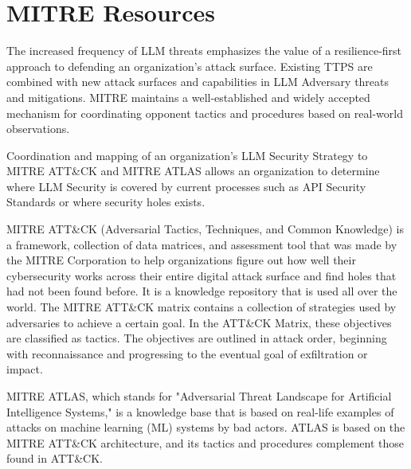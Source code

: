 
\clearpage
\section{MITRE Resources}

The increased frequency of LLM threats emphasizes the value of a
resilience-first approach to defending an organization's attack surface.
Existing TTPS are combined with new attack surfaces and capabilities in LLM
Adversary threats and mitigations. MITRE maintains a well-established and
widely accepted mechanism for coordinating opponent tactics and procedures
based on real-world observations.

Coordination and mapping of an organization's LLM Security Strategy to MITRE
ATT\&CK and MITRE ATLAS allows an organization to determine where LLM Security
is covered by current processes such as API Security Standards or where
security holes exists.

MITRE ATT\&CK (Adversarial Tactics, Techniques, and Common Knowledge) is a
framework, collection of data matrices, and assessment tool that was made by
the MITRE Corporation to help organizations figure out how well their
cybersecurity works across their entire digital attack surface and find holes
that had not been found before. It is a knowledge repository that is used all
over the world. The MITRE ATT\&CK matrix contains a collection of strategies
used by adversaries to achieve a certain goal. In the ATT\&CK Matrix, these
objectives are classified as tactics. The objectives are outlined in attack
order, beginning with reconnaissance and progressing to the eventual goal of
exfiltration or impact.

MITRE ATLAS, which stands for "Adversarial Threat Landscape for Artificial
Intelligence Systems," is a knowledge base that is based on real-life examples
of attacks on machine learning (ML) systems by bad actors. ATLAS is based on the
MITRE ATT\&CK architecture, and its tactics and procedures complement those
found in ATT\&CK.

